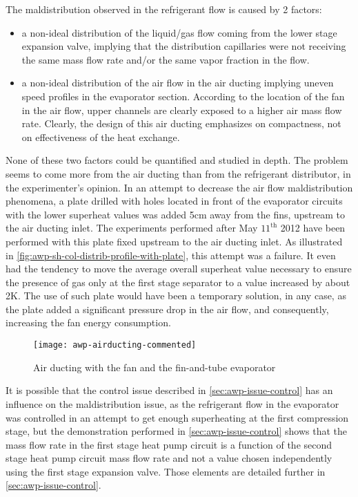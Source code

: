 The maldistribution observed in the refrigerant flow is caused by 2
factors:

\begin{itemize}
\item a non-ideal distribution of the liquid/gas flow coming from the
  lower stage expansion valve, implying that the distribution
  capillaries were not receiving the same mass flow rate and/or the
  same vapor fraction in the flow.
\item a non-ideal distribution of the air flow in the air ducting
  implying uneven speed profiles in the evaporator section. According
  to the location of the fan in the air flow, upper channels are
  clearly exposed to a higher air mass flow rate. Clearly, the design
  of this air ducting emphasizes on compactness, not on effectiveness
  of the heat exchange.
\end{itemize}

None of these two factors could be quantified and studied in
depth. The problem seems to come more from the air ducting than from
the refrigerant distributor, in the experimenter's opinion. In an
attempt to decrease the air flow maldistribution phenomena, a plate
drilled with holes located in front of the evaporator circuits with
the lower superheat values was added 5cm away from the fins, upstream
to the air ducting inlet. The experiments performed after May
$11^{\text{th}}$ 2012 have been performed with this plate fixed
upstream to the air ducting inlet. As illustrated in
\cref{fig:awp-sh-col-distrib-profile-with-plate}, this attempt was a
failure. It even had the tendency to move the average overall
superheat value necessary to ensure the presence of gas only at the
first stage separator to a value increased by about
2\si{\kelvin}. The use of such plate would have been a
temporary solution, in any case, as the plate added a significant
pressure drop in the air flow, and consequently, increasing the
fan energy consumption.

\begin{figure}[htbp]
  \centering
  \texttt{[image: awp-airducting-commented]}
  \caption{Air ducting with the fan and the fin-and-tube evaporator}
  \label{fig:awp-air-channel}
\end{figure}

It is possible that the control issue described in
\cref{sec:awp-issue-control} has an influence on the maldistribution
issue, as the refrigerant flow in the evaporator was controlled in an
attempt to get enough superheating at the first compression stage, but
the demonstration performed in \cref{sec:awp-issue-control} shows that
the mass flow rate in the first stage heat pump circuit is a function
of the second stage heat pump circuit mass flow rate and not a value
chosen independently using the first stage expansion valve. Those
elements are detailed further in \cref{sec:awp-issue-control}.

